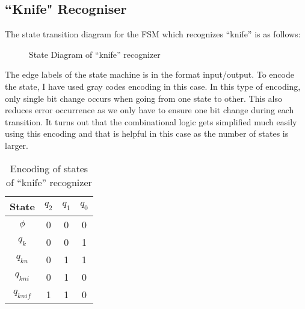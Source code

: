 \documentclass[12pt]{article}
\begin{document}
\subsection{``Knife" Recogniser}
The state transition diagram for the FSM which recognizes ``knife'' is as follows:
\begin{figure}[H] %
    \centering %
    \caption{State Diagram of ``knife'' recognizer}
\end{figure}
The edge labels of the state machine is in the format input/output.
To encode the state, I have used gray codes encoding in this case. In this type of encoding, only single bit change occurs when going from one state to other. This also reduces error occurrence as we only have to ensure one bit change during each transition. It turns out that the combinational logic gets simplified much easily using this encoding and that is helpful in this case as the number of states is larger.
\begin{table}[H]
	\centering
	\begin{tabular}{|c|c|c|c|}
	\hline
	\textbf{State} 	& $q_2$	& $q_1$ & $q_0$ \\
	\hline
	$\phi$		& 0 & 0	& 0	\\
	$q_k$		& 0 & 0	& 1	\\
	$q_{kn}$	& 0 & 1	& 1	\\
	$q_{kni}$	& 0 & 1	& 0	\\
	$q_{knif}$	& 1 & 1	& 0	\\
	\hline
	\end{tabular}
	\caption{Encoding of states of ``knife'' recognizer}
\end{table}
\end{document}
